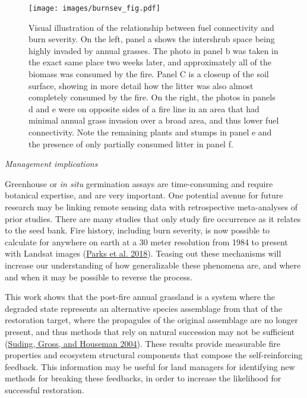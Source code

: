 \documentclass[
  12pt,
]{article}
\begin{document}
\begin{figure}
\centering
\texttt{[image: images/burnsev\_fig.pdf]}
\caption{Visual illustration of the relationship between fuel
connectivity and burn severity. On the left, panel a shows the
intershrub space being highly invaded by annual grasses. The photo in
panel b was taken in the exact same place two weeks later, and
approximately all of the biomass was consumed by the fire. Panel C is a
closeup of the soil surface, showing in more detail how the litter was
also almost completely consumed by the fire. On the right, the photos in
panels d and e were on opposite sides of a fire line in an area that had
minimal annual grass invasion over a broad area, and thus lower fuel
connectivity. Note the remaining plants and stumps in panel e and the
presence of only partially consumed litter in panel f.}
\end{figure}

\emph{Management implications}

Greenhouse or \emph{in situ} germination assays are time-consuming and
require botanical expertise, and are very important. One potential
avenue for future research may be linking remote sensing data with
retrospective meta-analyses of prior studies. There are many studies
that only study fire occurrence as it relates to the seed bank. Fire
history, including burn severity, is now possible to calculate for
anywhere on earth at a 30 meter resolution from 1984 to present with
Landsat images (\protect\hyperlink{ref-Parks2018}{Parks et al. 2018}).
Teasing out these mechanisms will increase our understanding of how
generalizable these phenomena are, and where and when it may be possible
to reverse the process.

This work shows that the post-fire annual grassland is a system where
the degraded state represents an alternative species assemblage from
that of the restoration target, where the propagules of the original
assemblage are no longer present, and thus methods that rely on natural
succession may not be sufficient
(\protect\hyperlink{ref-Suding2004}{Suding, Gross, and Houseman 2004}).
These results provide measurable fire properties and ecosystem
structural components that compose the self-reinforcing feedback. This
information may be useful for land managers for identifying new methods
for breaking these feedbacks, in order to increase the likelihood for
successful restoration.
\end{document}
